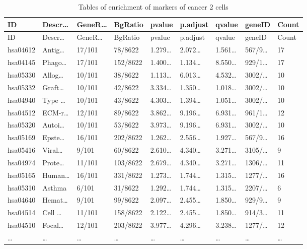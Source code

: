 \documentclass[
]{article}
\begin{document}
\begin{longtable}[]{@{}lllllllll@{}}
\caption{\label{tab:tables-of-enrichment-of-markers-of-cancer-2-cells}Tables of enrichment of markers of cancer 2 cells}\tabularnewline
\toprule
ID & Descr\ldots{} & GeneR\ldots{} & BgRatio & pvalue & p.adjust & qvalue & geneID & Count\tabularnewline
\midrule
\endfirsthead
\toprule
ID & Descr\ldots{} & GeneR\ldots{} & BgRatio & pvalue & p.adjust & qvalue & geneID & Count\tabularnewline
\midrule
\endhead
hsa04612 & Antig\ldots{} & 17/101 & 78/8622 & 1.279\ldots{} & 2.072\ldots{} & 1.561\ldots{} & 567/9\ldots{} & 17\tabularnewline
hsa04145 & Phago\ldots{} & 17/101 & 152/8622 & 1.400\ldots{} & 1.134\ldots{} & 8.550\ldots{} & 929/1\ldots{} & 17\tabularnewline
hsa05330 & Allog\ldots{} & 10/101 & 38/8622 & 1.113\ldots{} & 6.013\ldots{} & 4.532\ldots{} & 3002/\ldots{} & 10\tabularnewline
hsa05332 & Graft\ldots{} & 10/101 & 42/8622 & 3.334\ldots{} & 1.350\ldots{} & 1.018\ldots{} & 3002/\ldots{} & 10\tabularnewline
hsa04940 & Type \ldots{} & 10/101 & 43/8622 & 4.303\ldots{} & 1.394\ldots{} & 1.051\ldots{} & 3002/\ldots{} & 10\tabularnewline
hsa04512 & ECM-r\ldots{} & 12/101 & 89/8622 & 3.862\ldots{} & 9.196\ldots{} & 6.931\ldots{} & 961/1\ldots{} & 12\tabularnewline
hsa05320 & Autoi\ldots{} & 10/101 & 53/8622 & 3.973\ldots{} & 9.196\ldots{} & 6.931\ldots{} & 3002/\ldots{} & 10\tabularnewline
hsa05169 & Epste\ldots{} & 16/101 & 202/8622 & 1.262\ldots{} & 2.556\ldots{} & 1.927\ldots{} & 567/9\ldots{} & 16\tabularnewline
hsa05416 & Viral\ldots{} & 9/101 & 60/8622 & 2.610\ldots{} & 4.340\ldots{} & 3.271\ldots{} & 3105/\ldots{} & 9\tabularnewline
hsa04974 & Prote\ldots{} & 11/101 & 103/8622 & 2.679\ldots{} & 4.340\ldots{} & 3.271\ldots{} & 1306/\ldots{} & 11\tabularnewline
hsa05165 & Human\ldots{} & 16/101 & 331/8622 & 1.273\ldots{} & 1.744\ldots{} & 1.315\ldots{} & 1277/\ldots{} & 16\tabularnewline
hsa05310 & Asthma & 6/101 & 31/8622 & 1.292\ldots{} & 1.744\ldots{} & 1.315\ldots{} & 2207/\ldots{} & 6\tabularnewline
hsa04640 & Hemat\ldots{} & 9/101 & 99/8622 & 2.097\ldots{} & 2.455\ldots{} & 1.850\ldots{} & 929/9\ldots{} & 9\tabularnewline
hsa04514 & Cell \ldots{} & 11/101 & 158/8622 & 2.122\ldots{} & 2.455\ldots{} & 1.850\ldots{} & 914/3\ldots{} & 11\tabularnewline
hsa04510 & Focal\ldots{} & 12/101 & 203/8622 & 3.977\ldots{} & 4.296\ldots{} & 3.238\ldots{} & 1277/\ldots{} & 12\tabularnewline
\ldots{} & \ldots{} & \ldots{} & \ldots{} & \ldots{} & \ldots{} & \ldots{} & \ldots{} & \ldots{}\tabularnewline
\bottomrule
\end{longtable}
\end{document}
